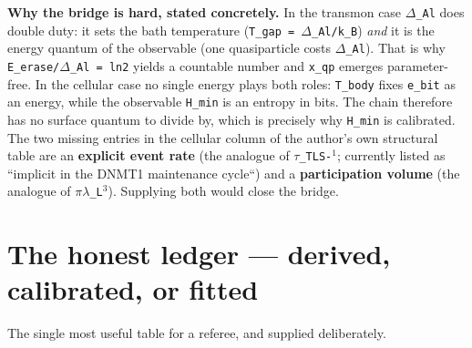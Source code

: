 \documentclass[12pt,a4paper]{article}
\begin{document}
\textbf{Why the bridge is hard, stated concretely.} In the transmon case \texttt{$\Delta$\_Al} does double duty: it sets the bath temperature (\texttt{T\_gap = $\Delta$\_Al/k\_B}) \textit{and} it is the energy quantum of the observable (one quasiparticle costs \texttt{$\Delta$\_Al}). That is why \texttt{E\_erase/$\Delta$\_Al = ln2} yields a countable number and \texttt{x\_qp} emerges parameter-free. In the cellular case no single energy plays both roles: \texttt{T\_body} fixes \texttt{e\_bit} as an energy, while the observable \texttt{H\_min} is an entropy in bits. The chain therefore has no surface quantum to divide by, which is precisely why \texttt{H\_min} is calibrated. The two missing entries in the cellular column of the author's own structural table are an \textbf{explicit event rate} (the analogue of \texttt{$\tau$\_TLS-$^{1}$}; currently listed as ``implicit in the DNMT1 maintenance cycle``) and a \textbf{participation volume} (the analogue of \texttt{$\pi\lambda$\_L$^{3}$}). Supplying both would close the bridge.







\section{The honest ledger --- derived, calibrated, or fitted}

The single most useful table for a referee, and supplied deliberately.
\end{document}
